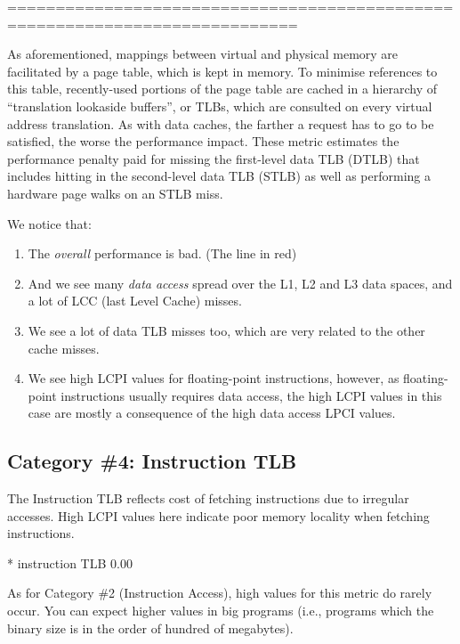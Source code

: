============================================================================

As aforementioned, mappings between virtual and physical memory are facilitated by a page table, which is kept in memory. To minimise references to this table, recently-used portions of the page table are cached in a hierarchy of ``translation lookaside buffers'', or TLBs, which are consulted on every virtual address translation. As with data caches, the farther a request has to go to be satisfied, the worse the performance impact. These metric estimates the performance penalty paid for missing the first-level data TLB (DTLB) that includes hitting in the second-level data TLB (STLB) as well as performing a hardware page walks on an STLB miss.

We notice that:

\begin{enumerate}
  \item The \emph{overall} performance is bad. (The line in red)
  \item And we see many \emph{data access} spread over the L1, L2 and L3 data spaces, and a lot of LCC (last Level Cache) misses.
  \item We see a lot of data TLB misses too, which are very related to the other cache misses.
  \item We see high LCPI values for floating-point instructions, however, as floating-point instructions usually requires data access, the high LCPI values in this case are mostly a consequence of the high data access LPCI values.
\end{enumerate}

\subsection{Category \#4: Instruction TLB}
\label{subsec:CAT4_Instruction_TLB}

The Instruction TLB reflects cost of fetching instructions due to irregular accesses. High LCPI values here indicate poor memory locality when fetching instructions.

\begin{prompt}
* instruction TLB       0.00
\end{prompt}

As for Category \#2 (Instruction Access), high values for this metric do rarely occur. You can expect higher values in big programs (i.e., programs which the binary size is in the order of hundred of megabytes).

